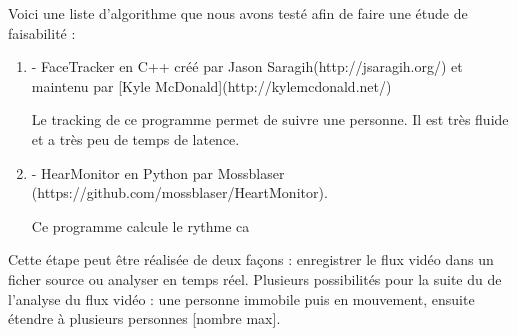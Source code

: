 \documentclass[12pt,a4paper]{article}
\begin{document}
Voici une liste d'algorithme que nous avons testé afin de faire une étude de faisabilité : 

\begin{enumerate}


\item[] - FaceTracker en C++ créé par Jason Saragih(http://jsaragih.org/) et maintenu par [Kyle McDonald](http://kylemcdonald.net/)

Le tracking de ce programme permet de suivre une personne. Il est très fluide et a très peu de temps de latence.

\item[] - HearMonitor en Python par Mossblaser (https://github.com/mossblaser/HeartMonitor).

Ce programme calcule le rythme ca
\end{enumerate}



Cette étape peut être réalisée de deux façons : enregistrer le flux vidéo dans un ficher source ou analyser en temps réel.
Plusieurs possibilités pour la suite du de l'analyse du flux vidéo : une personne immobile puis en mouvement, ensuite étendre à plusieurs personnes [nombre max].
\end{document}
